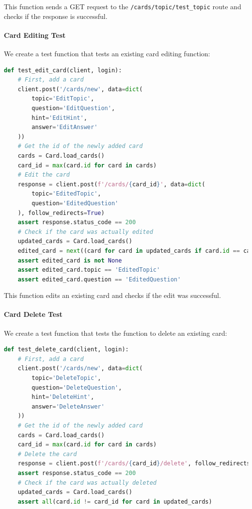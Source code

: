 This function sends a GET request to the \texttt{/cards/topic/test\_topic} route and checks if the response is successful.

\paragraph{Card Editing Test}
We create a test function that tests an existing card editing function:

\begin{lstlisting}[language=Python]
def test_edit_card(client, login):
    # First, add a card
    client.post('/cards/new', data=dict(
        topic='EditTopic',
        question='EditQuestion',
        hint='EditHint',
        answer='EditAnswer'
    ))
    # Get the id of the newly added card
    cards = Card.load_cards()
    card_id = max(card.id for card in cards)
    # Edit the card
    response = client.post(f'/cards/{card_id}', data=dict(
        topic='EditedTopic',
        question='EditedQuestion'
    ), follow_redirects=True)
    assert response.status_code == 200
    # Check if the card was actually edited
    updated_cards = Card.load_cards()
    edited_card = next((card for card in updated_cards if card.id == card_id), None)
    assert edited_card is not None
    assert edited_card.topic == 'EditedTopic'
    assert edited_card.question == 'EditedQuestion'

\end{lstlisting}

This function edits an existing card and checks if the edit was successful.


\paragraph{Card Delete Test}
We create a test function that tests the function to delete an existing card:

\begin{lstlisting}[language=Python]
def test_delete_card(client, login):
    # First, add a card
    client.post('/cards/new', data=dict(
        topic='DeleteTopic',
        question='DeleteQuestion',
        hint='DeleteHint',
        answer='DeleteAnswer'
    ))
    # Get the id of the newly added card
    cards = Card.load_cards()
    card_id = max(card.id for card in cards)
    # Delete the card
    response = client.post(f'/cards/{card_id}/delete', follow_redirects=True)
    assert response.status_code == 200
    # Check if the card was actually deleted
    updated_cards = Card.load_cards()
    assert all(card.id != card_id for card in updated_cards)


\end{lstlisting}

